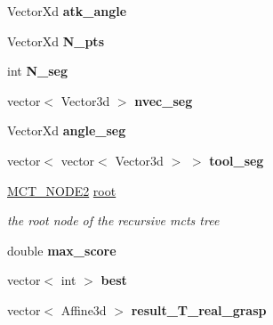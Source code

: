 \begin{DoxyCompactItemize}
\mbox{\label{classMCT__Search2_a4af66928c3894e0a3e076553218d8d39}} 
Vector\+Xd {\bfseries atk\+\_\+angle}
\item 
\mbox{\label{classMCT__Search2_ace3274d47de8b547410d03e3c3072ab4}} 
Vector\+Xd {\bfseries N\+\_\+pts}
\item 
\mbox{\label{classMCT__Search2_ac9007c514b07e8fe9778546f33ad01f9}} 
int {\bfseries N\+\_\+seg}
\item 
\mbox{\label{classMCT__Search2_a5f725b246fd7983ad71a5ad3fa89153d}} 
vector$<$ Vector3d $>$ {\bfseries nvec\+\_\+seg}
\item 
\mbox{\label{classMCT__Search2_ae1f12aaae410cc588bf933e60844c40d}} 
Vector\+Xd {\bfseries angle\+\_\+seg}
\item 
\mbox{\label{classMCT__Search2_aa512eae7e5edbeca962a9e5376b361a5}} 
vector$<$ vector$<$ Vector3d $>$ $>$ {\bfseries tool\+\_\+seg}
\item 
\mbox{\label{classMCT__Search2_ae46e0202a8de87514af28804c9998af6}} 
\hyperlink{classMCT__NODE2}{M\+C\+T\+\_\+\+N\+O\+D\+E2} \hyperlink{classMCT__Search2_ae46e0202a8de87514af28804c9998af6}{root}
\begin{DoxyCompactList}\small\item\em the root node of the recursive mcts tree \end{DoxyCompactList}\item 
\mbox{\label{classMCT__Search2_ad6e67e001645b1e495a6b53b6b4e16fa}} 
double {\bfseries max\+\_\+score}
\item 
\mbox{\label{classMCT__Search2_a28e37393acafb6585057baa91d60c2c7}} 
vector$<$ int $>$ {\bfseries best}
\item 
\mbox{\label{classMCT__Search2_a37113270700238ba6e3b6d3127d059b9}} 
vector$<$ Affine3d $>$ {\bfseries result\+\_\+\+T\+\_\+real\+\_\+grasp}
\item 
\mbox{\label{classMCT__Search2_a8d8d1889224c49076725d99d218ff430}} 

\end{DoxyCompactItemize}
